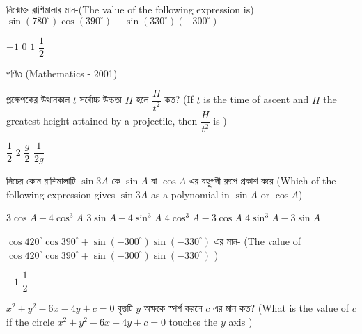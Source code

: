 \documentclass[addpoints]{exam}
\begin{document}
\begin{questions}
\question  নিন্মোক্ত রাশিমালার মান-(The value of the following expression is) $ \sin (780^{\circ})\cos (390^{\circ})-\sin (330^{\circ}) (-300^{\circ})$   

\begin{oneparchoices}
\choice $ -1 $
\choice $ 0 $
\choice $ 1 $
\choice $ \dfrac{1}{2} $
\end{oneparchoices}

\end{questions}

\begin{LARGE}
\begin{center}
গণিত (Mathematics - 2001)
\end{center}
\end{LARGE}
\begin{questions}

\question  প্রক্ষেপকের উত্থানকাল $ t $ সর্বোচ্চ উচ্চতা $ H $ হলে $ \dfrac{H}{t^{2}} $ কত? (If $ t $ is the time of ascent and $ H $ the greatest height attained by a projectile, then $ \dfrac{H}{t^{2}} $ is )

\begin{oneparchoices}
\choice $ \dfrac{1}{2} $
\choice $ 2 $
\choice $ \dfrac{g}{2} $
\choice $ \dfrac{1}{2g} $
\end{oneparchoices}

\question নিচের কোন রাশিমালাটি $ \sin 3A $ কে $ \sin A $ বা $ \cos A $ এর বহুপদী রুপে প্রকাশ করে (Which of the following expression gives  $ \sin 3A $ as a polynomial in $ \sin A $ or $ \cos A $) -

\begin{oneparchoices}
\choice  $ 3\cos A -4\cos^{3} A $
\choice  $ 3\sin A -4\sin^{3} A $
\choice  $ 4\cos^{3} A -3\cos A $
\choice  $ 4\sin^{3} A -3\sin A $
\end{oneparchoices}

\question  $ \cos 420^{\circ}\cos 390^{\circ} + \sin (-300^{\circ})\sin (-330^{\circ}) $ এর মান- (The value of $ \cos 420^{\circ}\cos 390^{\circ} + \sin (-300^{\circ})\sin (-330^{\circ}) $ ) 

\begin{oneparchoices}
\choice  $ -1 $
\choice  $ \dfrac{1}{2} $
\end{oneparchoices}

\question $ x^{2}+y^{2}-6x-4y+c=0 $ বৃত্তটি $ y $ অক্ষকে স্পর্শ করলে $ c $ এর মান কত? (What is the value of $ c $ if the circle $ x^{2}+y^{2}-6x-4y+c=0 $ touches the $ y $ axis )

\begin{oneparchoices}
\end{oneparchoices}


\end{questions}
\end{document}
